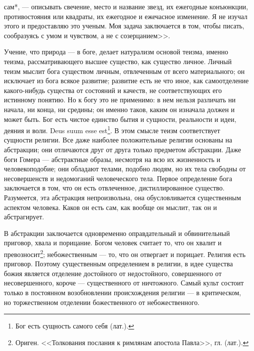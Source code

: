 \documentclass[12pt,oneside]{book}
\newcommand{\rom}[1]{\uppercase\expandafter{\romannumeral #1\relax}}
\begin{document}
сам*\let\svthefootnote\thefootnote\let\thefootnote\relax{}\let\thefootnote\svthefootnote, --- описывать свечение, место и название звезд, их ежегодные конъюнкции, противостояния или квадраты, их ежегодное и ежечасное изменение. Я не изучал этого и предоставляю это ученым. Моя задача заключается в том, чтобы писать, сообразуясь с умом и чувством, а не с созерцанием>>.




Учение, что природа --- в боге, делает натурализм основой теизма, именно теизма, рассматривающего высшее существо, как существо личное. Личный теизм мыслит бога существом личным, отвлеченным от всего материального; он исключает из бога всякое развитие; развитие есть не что иное, как самоотделение какого-нибудь существа от состояний и качеств, не соответствующих его истинному понятию. Но к богу это не применимо: в нем нельзя различать ни начала, ни конца, ни средины; он именно таков, каким он изначала должен и может быть. Бог есть чистое единство бытия и сущности, реальности и идеи, деяния и воли. Deus suum esse est\footnote{Бог есть сущность самого себя (лат.).}. В этом смысле теизм соответствует сущности религии. Все даже наиболее положительные религии основаны на абстракции; они отличаются друг от друга только предметом абстракции. Даже боги Гомера --- абстрактные образы, несмотря на всю их жизненность и человекоподобие; они обладают телами, подобно людям, но их тела свободны от несовершенств и недомоганий человеческого тела. Первое определение бога заключается в том, что он есть отвлеченное, дистиллированное существо. Разумеется, эта абстракция непроизвольна, она обусловливается существенным аспектом человека. Каков он есть сам, как вообще он мыслит, так он и абстрагирует.

В абстракции заключается одновременно оправдательный и обвинительный приговор, хвала и порицание. Богом человек считает то, что он хвалит и превозносит\dag\let\svthefootnote\thefootnote\let\thefootnote\relax{}\let\thefootnote\svthefootnote\footnote{Ориген. <<Толкования послания к римлянам апостола Павла>>, гл. \rom{1} (лат.).}; небожественным --- то, что он отвергает и порицает. Религия есть приговор. Поэтому существенным определением в религии, в идее существа божия является отделение достойного от недостойного, совершенного от несовершенного, короче --- существенного от ничтожного. Самый культ состоит только в постоянном возобновлении происхождения религии --- в критическом, но торжественном отделении божественного от небожественного.
\end{document}
